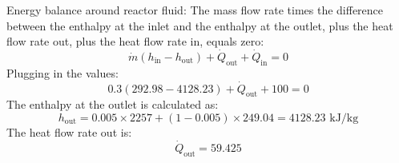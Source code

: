 Energy balance around reactor fluid:
The mass flow rate times the difference between the enthalpy at the inlet and the enthalpy at the outlet, plus the heat flow rate out, plus the heat flow rate in, equals zero:
\[ \dot{m} (h_{\text{in}} - h_{\text{out}}) + \dot{Q}_{\text{out}} + \dot{Q}_{\text{in}} = 0 \]
Plugging in the values:
\[ 0.3 (292.98 - 4128.23) + \dot{Q}_{\text{out}} + 100 = 0 \]
The enthalpy at the outlet is calculated as:
\[ h_{\text{out}} = 0.005 \times 2257 + (1 - 0.005) \times 249.04 = 4128.23 \text{ kJ/kg} \]
The heat flow rate out is:
\[ \dot{Q}_{\text{out}} = 59.425 \]